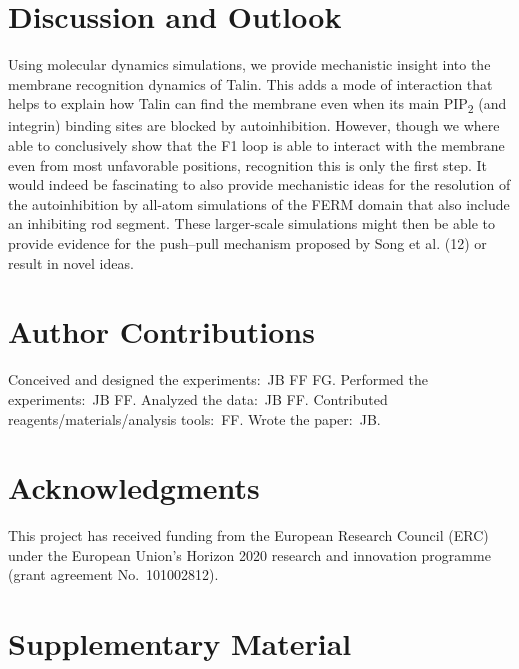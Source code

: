 \documentclass[
  letterpaper,
  DIV=11,
  numbers=noendperiod]{scrartcl}
\begin{document}
\hypertarget{discussion-and-outlook}{%
\section{Discussion and Outlook}\label{discussion-and-outlook}}

Using molecular dynamics simulations, we provide mechanistic insight
into the membrane recognition dynamics of Talin. This adds a mode of
interaction that helps to explain how Talin can find the membrane even
when its main PIP\textsubscript{2} (and integrin) binding sites are
blocked by autoinhibition. However, though we where able to conclusively
show that the F1 loop is able to interact with the membrane even from
most unfavorable positions, recognition this is only the first step. It
would indeed be fascinating to also provide mechanistic ideas for the
resolution of the autoinhibition by all-atom simulations of the FERM
domain that also include an inhibiting rod segment. These larger-scale
simulations might then be able to provide evidence for the push--pull
mechanism proposed by Song et al. (12) or result in novel ideas.

\hypertarget{author-contributions}{%
\section{Author Contributions}\label{author-contributions}}

Conceived and designed the experiments:~JB FF FG. Performed the
experiments:~JB FF. Analyzed the data:~JB FF. Contributed
reagents/materials/analysis tools:~FF. Wrote the paper:~JB.

\hypertarget{acknowledgments}{%
\section{Acknowledgments}\label{acknowledgments}}

This project has received funding from the European Research Council
(ERC) under the European Union's Horizon 2020 research and innovation
programme (grant agreement No.~101002812).

\hypertarget{supplementary-material}{%
\section{Supplementary Material}\label{supplementary-material}}
\end{document}
